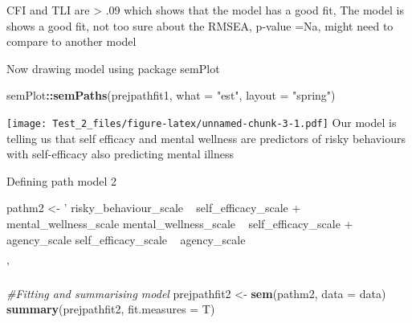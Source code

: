 \documentclass[9pt,]{article}
\newenvironment{Shaded}{\begin{snugshade}}{\end{snugshade}}
\newcommand{\KeywordTok}[1]{\textcolor[rgb]{0.13,0.29,0.53}{\textbf{#1}}}
\newcommand{\DataTypeTok}[1]{\textcolor[rgb]{0.13,0.29,0.53}{#1}}
\newcommand{\StringTok}[1]{\textcolor[rgb]{0.31,0.60,0.02}{#1}}
\newcommand{\CommentTok}[1]{\textcolor[rgb]{0.56,0.35,0.01}{\textit{#1}}}
\newcommand{\OperatorTok}[1]{\textcolor[rgb]{0.81,0.36,0.00}{\textbf{#1}}}
\newcommand{\NormalTok}[1]{#1}
\begin{document}
CFI and TLI are \textgreater{} .09 which shows that the model has a good
fit, The model is shows a good fit, not too sure about the RMSEA,
p-value =Na, might need to compare to another model

Now drawing model using package semPlot

\begin{Shaded}
\begin{Highlighting}[]
\NormalTok{semPlot}\OperatorTok{::}\KeywordTok{semPaths}\NormalTok{(prejpathfit1, }\DataTypeTok{what =} \StringTok{"est"}\NormalTok{, }\DataTypeTok{layout =} \StringTok{"spring"}\NormalTok{)}
\end{Highlighting}
\end{Shaded}

\texttt{[image: Test\_2\_files/figure-latex/unnamed-chunk-3-1.pdf]} Our
model is telling us that self efficacy and mental wellness are
predictors of risky behaviours with self-efficacy also predicting mental
illness

Defining path model 2

\begin{Shaded}
\begin{Highlighting}[]
\NormalTok{pathm2 <-}\StringTok{ '}
\StringTok{      risky_behaviour_scale ~ self_efficacy_scale + mental_wellness_scale}
\StringTok{      mental_wellness_scale ~ self_efficacy_scale + agency_scale}
\StringTok{      self_efficacy_scale ~  agency_scale }

\StringTok{'}  

\CommentTok{#Fitting and summarising model}
\NormalTok{prejpathfit2 <-}\StringTok{ }\KeywordTok{sem}\NormalTok{(pathm2, }\DataTypeTok{data =}\NormalTok{ data)}
\KeywordTok{summary}\NormalTok{(prejpathfit2, }\DataTypeTok{fit.measures =}\NormalTok{ T) }
\end{Highlighting}
\end{Shaded}
\end{document}
